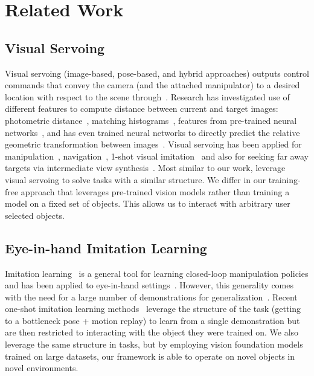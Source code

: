 \section{Related Work}




\subsection{Visual Servoing}
Visual servoing (image-based,
pose-based, and hybrid approaches) outputs
control commands that convey the camera (and the attached manipulator) to a
desired location with respect to the scene through~\cite{corke1993visual,
chaumette2016visual, chaumette2006visual}.  Research has investigated use of
different features to compute distance between current and target images:
photometric distance~\cite{collewet2011photometric}, matching
histograms~\cite{bateux2016histograms}, features from pre-trained neural
networks~\cite{lee2017learning}, and has even trained neural networks to
directly predict the relative geometric transformation between
images~\cite{bateux2018training}. Visual servoing has been applied for 
manipulation~\cite{sadeghi2018sim2real}, 
navigation~\cite{sadeghi2019divis, li2021survey, qureshi2021rtvs}, 
1-shot visual imitation~\cite{argus2020flowcontrol} and also for
seeking far away targets via intermediate view 
synthesis~\cite{crombez2021subsequent}. Most similar to our work, \cite{collins2024forcesight} leverage visual servoing to solve tasks 
with a similar structure. We differ in our training-free approach
that leverages pre-trained vision models rather than training a model
on a fixed set of objects. This allows us to interact with arbitrary user selected objects.


\subsection{Eye-in-hand Imitation Learning}
Imitation learning~\cite{pomerleau1991efficient, schaal1996learning} is a
general tool for learning closed-loop manipulation policies and has been
applied to eye-in-hand settings~\cite{chi2024universal, young2021visual,
zhang2024diffusion, shafiullah2023bringing, etukuru2024robot}.
However, this generality comes with the
need for a large number of demonstrations for
generalization~\cite{khazatsky2024droid}. Recent one-shot imitation learning
methods~\cite{valassakis2022demonstrate, wen2022you} %
leverage the structure of the task (getting to a bottleneck pose + motion
replay) to learn from a single demonstration but are then restricted to
interacting with the object they were trained on. We also leverage the same
structure in tasks, but by employing vision foundation models
trained on large datasets, our framework is able
to operate on novel objects in novel environments.

